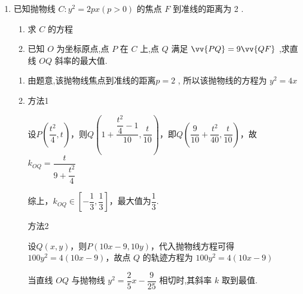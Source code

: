 \begin{enumerate}
\begin{enumerate}
\begin{jieda}
\begin{enumerate}
                当且仅当 ${k}^{2} = \dfrac{1}{{k}^{2}}$ 即 $k =  \pm  1$ 时, $\vv{AD} \cdot  \vv{EB}$ 取最小值 16.
            \end{enumerate}
        \end{jieda}
    
        
        \item 已知抛物线 $C : {y}^{2} = {2px}\left( {p > 0}\right)$ 的焦点 $F$ 到准线的距离为 2 .
        \begin{enumerate}
            \item 求 $C$ 的方程
            \item 已知 $O$ 为坐标原点,点 $P$ 在 $C$ 上,点 $Q$ 满足 $\vv{PQ} = 9\vv{QF}$ ,求直线 ${OQ}$ 斜率的最大值.
        \end{enumerate}
        \begin{jieda}
            \begin{enumerate}
                \item 由题意,该抛物线焦点到准线的距离$p = 2$ , 所以该抛物线的方程为 ${y}^{2} = {4x}$
                \item 
                方法1
                    
                    设$P\left(\dfrac{t^2}{4}, t\right)$，则$Q\left(1+\dfrac{\dfrac{t^2}{4}-1}{10}, \dfrac{t}{10}\right)$，即$Q\left(\dfrac{9}{10}+\dfrac{t^2}{40}, \dfrac{t}{10}\right)$，故$k_{OQ} = \dfrac{t}{9+\dfrac{t^2}{4}}$
        
                    综上，$k_{OQ} \in \left[-\dfrac{1}{3}, \dfrac{1}{3}\right]$，最大值为$\dfrac{1}{3}$.

                方法2
    
                    设$Q(x, y)$，则$P(10x-9, 10y)$，代入抛物线方程可得$100y^2 = 4(10x-9)$，故点 $Q$ 的轨迹方程为 $100y^2 = 4(10x-9)$
    
                    当直线 ${OQ}$ 与抛物线 ${y}^{2} = \dfrac{2}{5}x - \dfrac{9}{25}$ 相切时,其斜率 $k$ 取到最值.
    

\end{enumerate}
\end{jieda}
\end{enumerate}
\end{enumerate}
